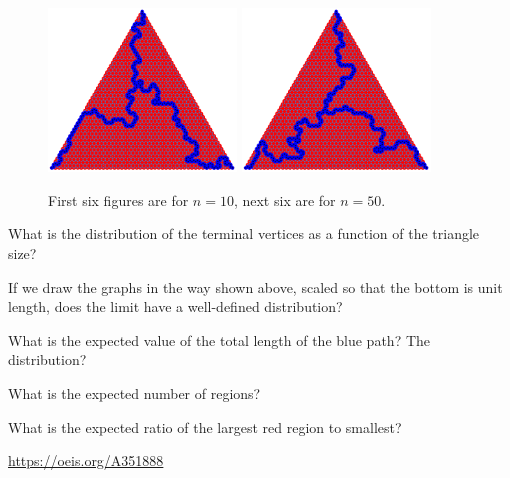 \documentclass{article}
\begin{document}
\begin{figure}[ht!]
  \includegraphics[width=5cm]{assets/126_problem/n_50_4.pdf}
  \includegraphics[width=5cm]{assets/126_problem/n_50_6.pdf}
  \caption{
    First six figures are for $n=10$, next six are for $n=50$.
  }
\end{figure}

\begin{question}
  What is the distribution of the terminal vertices as a function of the triangle size?
\end{question}

\begin{related}
  \item If we draw the graphs in the way shown above, scaled so that the bottom
  is unit length, does the limit have a well-defined distribution?
  \item What is the expected value of the total length of the blue path? The distribution?
  \item What is the expected number of regions?
  \item What is the expected ratio of the largest red region to smallest?
\end{related}

\begin{references}
  \item \url{https://oeis.org/A351888}
\end{references}
\end{document}
